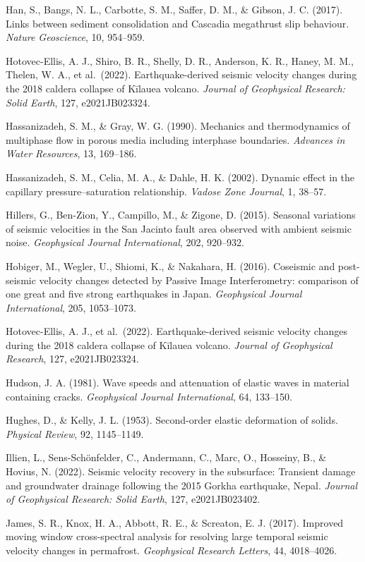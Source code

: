 \documentclass[12pt]{article}
\begin{document}
Han, S., Bangs, N. L., Carbotte, S. M., Saffer, D. M., \& Gibson, J. C.
(2017). Links between sediment consolidation and Cascadia megathrust
slip behaviour. \emph{Nature Geoscience}, 10, 954--959.

Hotovec-Ellis, A. J., Shiro, B. R., Shelly, D. R., Anderson, K. R.,
Haney, M. M., Thelen, W. A., et al.~(2022). Earthquake-derived seismic
velocity changes during the 2018 caldera collapse of Kīlauea volcano.
\emph{Journal of Geophysical Research: Solid Earth}, 127, e2021JB023324.

Hassanizadeh, S. M., \& Gray, W. G. (1990). Mechanics and thermodynamics
of multiphase flow in porous media including interphase boundaries.
\emph{Advances in Water Resources}, 13, 169--186.

Hassanizadeh, S. M., Celia, M. A., \& Dahle, H. K. (2002). Dynamic
effect in the capillary pressure--saturation relationship. \emph{Vadose
Zone Journal}, 1, 38--57.

Hillers, G., Ben-Zion, Y., Campillo, M., \& Zigone, D. (2015). Seasonal
variations of seismic velocities in the San Jacinto fault area observed
with ambient seismic noise. \emph{Geophysical Journal International},
202, 920--932.

Hobiger, M., Wegler, U., Shiomi, K., \& Nakahara, H. (2016). Coseismic
and post-seismic velocity changes detected by Passive Image
Interferometry: comparison of one great and five strong earthquakes in
Japan. \emph{Geophysical Journal International}, 205, 1053--1073.

Hotovec-Ellis, A. J., et al.~(2022). Earthquake-derived seismic velocity
changes during the 2018 caldera collapse of Kīlauea volcano.
\emph{Journal of Geophysical Research}, 127, e2021JB023324.

Hudson, J. A. (1981). Wave speeds and attenuation of elastic waves in
material containing cracks. \emph{Geophysical Journal International},
64, 133--150.

Hughes, D., \& Kelly, J. L. (1953). Second-order elastic deformation of
solids. \emph{Physical Review}, 92, 1145--1149.

Illien, L., Sens-Schönfelder, C., Andermann, C., Marc, O., Hosseiny, B.,
\& Hovius, N. (2022). Seismic velocity recovery in the subsurface:
Transient damage and groundwater drainage following the 2015 Gorkha
earthquake, Nepal. \emph{Journal of Geophysical Research: Solid Earth},
127, e2021JB023402.

James, S. R., Knox, H. A., Abbott, R. E., \& Screaton, E. J. (2017).
Improved moving window cross-spectral analysis for resolving large
temporal seismic velocity changes in permafrost. \emph{Geophysical
Research Letters}, 44, 4018--4026.
\end{document}
